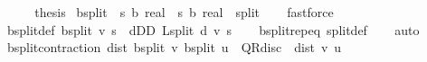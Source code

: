 \begin{isabellebody}
\ \ \isamarkupfalse%
\ \isamarkupfalse%
\ {\isacharquery}{\kern0pt}thesis\isacommand{{\isachardot}{\kern0pt}}\isamarkupfalse%
\isanewline
{}\isamarkupfalse%
%
\endisatagproof
{\isafoldproof}%
%
\isadelimproof
\isanewline
%
\endisadelimproof
\isanewline
{}\isamarkupfalse%
\ {\isasymL}\isactrlsub b{\isacharunderscore}{\kern0pt}split\ {\isacharcolon}{\kern0pt}{\isacharcolon}{\kern0pt}\ {\isachardoublequoteopen}{\isacharparenleft}{\kern0pt}{\isacharprime}{\kern0pt}s\ {\isasymRightarrow}\isactrlsub b\ real{\isacharparenright}{\kern0pt}\ {\isasymRightarrow}\ {\isacharparenleft}{\kern0pt}{\isacharprime}{\kern0pt}s\ {\isasymRightarrow}\isactrlsub b\ real{\isacharparenright}{\kern0pt}{\isachardoublequoteclose}\ \ {\isasymL}{\isacharunderscore}{\kern0pt}split\isanewline
%
\isadelimproof
\ \ %
\endisadelimproof
%
\isatagproof
{}\isamarkupfalse%
\ fastforce%
\endisatagproof
{\isafoldproof}%
%
\isadelimproof
\isanewline
%
\endisadelimproof
\isanewline
{}\isamarkupfalse%
\ {\isasymL}\isactrlsub b{\isacharunderscore}{\kern0pt}split{\isacharunderscore}{\kern0pt}def{\isacharprime}{\kern0pt}{\isacharcolon}{\kern0pt}\ {\isachardoublequoteopen}{\isasymL}\isactrlsub b{\isacharunderscore}{\kern0pt}split\ v\ s\ {\isacharequal}{\kern0pt}\ {\isacharparenleft}{\kern0pt}{\isasymSqunion}d{\isasymin}D\isactrlsub D{\isachardot}{\kern0pt}\ L{\isacharunderscore}{\kern0pt}split\ d\ v\ s{\isacharparenright}{\kern0pt}{\isachardoublequoteclose}\isanewline
%
\isadelimproof
\ \ %
\endisadelimproof
%
\isatagproof
{}\isamarkupfalse%
\ {\isasymL}\isactrlsub b{\isacharunderscore}{\kern0pt}split{\isachardot}{\kern0pt}rep{\isacharunderscore}{\kern0pt}eq\ {\isasymL}{\isacharunderscore}{\kern0pt}split{\isacharunderscore}{\kern0pt}def\isanewline
\ \ \isamarkupfalse%
\ auto%
\endisatagproof
{\isafoldproof}%
%
\isadelimproof
\isanewline
%
\endisadelimproof
\isanewline
{}\isamarkupfalse%
\ {\isasymL}\isactrlsub b{\isacharunderscore}{\kern0pt}split{\isacharunderscore}{\kern0pt}contraction{\isacharcolon}{\kern0pt}\ {\isachardoublequoteopen}dist\ {\isacharparenleft}{\kern0pt}{\isasymL}\isactrlsub b{\isacharunderscore}{\kern0pt}split\ v{\isacharparenright}{\kern0pt}\ {\isacharparenleft}{\kern0pt}{\isasymL}\isactrlsub b{\isacharunderscore}{\kern0pt}split\ u{\isacharparenright}{\kern0pt}\ {\isasymle}\ QR{\isacharunderscore}{\kern0pt}disc\ {\isacharasterisk}{\kern0pt}\ dist\ v\ u{\isachardoublequoteclose}\isanewline

\end{isabellebody}
